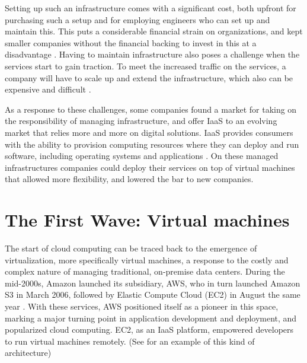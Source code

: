 \documentclass[
  table]{report}
\begin{document}
Setting up such an infrastructure comes with a significant cost, both
upfront for purchasing such a setup and for employing engineers who can
set up and maintain this. This puts a considerable financial strain on
organizations, and kept smaller companies without the financial backing
to invest in this at a disadvantage \citep{etroEconomicImpactCloud2009}.
Having to maintain infrastructure also poses a challenge when the
services start to gain traction. To meet the increased traffic on the
services, a company will have to scale up and extend the infrastructure,
which also can be expensive and difficult
\citep{armbrustViewCloudComputing2010}.

As a response to these challenges, some companies found a market for
taking on the responsibility of managing infrastructure, and offer
\ac{IaaS} to an evolving market that relies more and more on digital
solutions. \ac{IaaS} provides consumers with the ability to provision
computing resources where they can deploy and run software, including
operating systems and applications \citep{nist-def}. On these managed
infrastructures companies could deploy their services on top of virtual
machines that allowed more flexibility, and lowered the bar to new
companies.

\section{The First Wave: Virtual machines}
\label{sect:first-wave}

The start of cloud computing can be traced back to the emergence of
virtualization, more specifically virtual machines, a response to the
costly and complex nature of managing traditional, on-premise data
centers. During the mid-2000s, Amazon launched its subsidiary, \ac{AWS},
who in turn launched Amazon S3 in March 2006, followed by Elastic
Compute Cloud (EC2) in August the same year
\citep{barrAmazonEC2Beta2006}. With these services, \ac{AWS} positioned
itself as a pioneer in this space, marking a major turning point in
application development and deployment, and popularized cloud computing.
EC2, as an \ac{IaaS} platform, empowered developers to run virtual
machines remotely. (See  for an example of this kind
of architecture)
\end{document}
